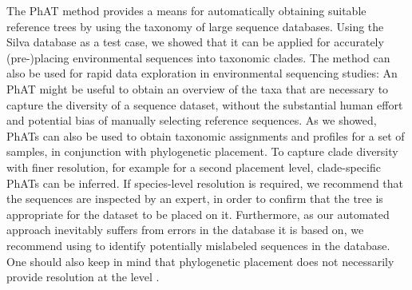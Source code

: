 The \acf{PhAT} method provides a means for automatically obtaining suitable reference trees
by using the taxonomy of large sequence databases.
Using the Silva database as a test case,
we showed that it can be applied for accurately (pre-)placing environmental sequences into taxonomic clades.
The method can also be used for rapid data exploration in environmental sequencing studies:
An \ac{PhAT} might be useful to obtain an overview of the taxa that are necessary to capture the diversity of a sequence dataset,
without the substantial human effort and potential bias of manually selecting reference sequences.
As we showed, \acp{PhAT} can also be used to obtain taxonomic assignments and profiles for a set of samples,
in conjunction with phylogenetic placement.
To capture clade diversity with finer resolution, for example for a second placement level,
clade-specific \acp{PhAT} can be inferred.
If species-level resolution is required, we recommend that the sequences are inspected by an expert,
in order to confirm that the tree is appropriate for the dataset to be placed on it.
Furthermore, as our automated approach inevitably suffers from errors in the database it is based on,
we recommend using  \citep{Kozlov2016}
to identify potentially mislabeled sequences in the database.
One should also keep in mind that phylogenetic placement
does not necessarily provide resolution at the  level \citep{Dunthorn2014}.

